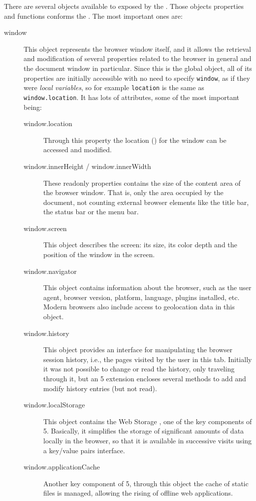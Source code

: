 There are several objects available to  exposed by the .
Those objects properties and functions conforms the .
The most important ones are:

\begin{description}
  \item[window] This object represents the browser window itself, and it allows the retrieval and modification of several properties related to the browser in general and the document window in particular.
  Since this is the global object, all of its properties are initially accessible with no need to specify \texttt{window}, as if they were \emph{local variables}, so for example \texttt{location} is the same as \texttt{window.location}.
  It has lots of attributes, some of the most important being:
  \begin{description}
    \item[window.location] Through this property the location () for the window can be accessed and modified.
    \item[window.innerHeight / window.innerWidth] These readonly properties contains the size of the content area of the browser window. That is, only the area occupied by the document, not counting external browser elements like the title bar, the status bar or the menu bar.
    \item[window.screen] This object describes the screen: its size, its color depth and the position of the window in the screen.
    \item[window.navigator] This object contains information about the browser, such as the user agent, browser version, platform, language, plugins installed, etc.
    Modern browsers also include access to geolocation data in this object.
    \item[window.history] This object provides an interface for manipulating the browser session history, i.e., the pages visited by the user in this tab.
    Initially it was not possible to change or read the history, only traveling through it, but an 5 extension encloses several methods to add and modify history entries (but not read).
    \item[window.localStorage] This object contains the Web Storage , one of the key components of 5.
    Basically, it simplifies the storage of significant amounts of data locally in the browser, so that it is available in successive visits using a key/value pairs interface.
    \item[window.applicationCache] Another key component of 5, through this object the cache of static files is managed, allowing the rising of offline web applications.

\end{description}
\end{description}
